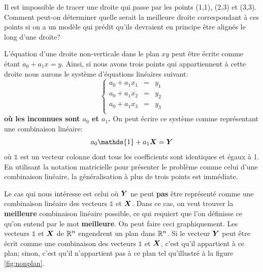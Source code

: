 \begin{center}
\begin{minipage}{0.45\textwidth}
Il est impossible de tracer une droite qui passe par les points (1,1), (2,3) et (3,3).
Comment peut-on déterminer quelle serait la meilleure droite correspondant à ces points 
si on a un modèle qui prédit qu'ils devraient
en principe être alignés le long d'une droite?
\end{minipage}\hfill
\begin{minipage}{0.45\textwidth}
\end{minipage}
\end{center}

L'équation d'une droite non-verticale dans le plan $xy$ peut être écrite comme étant
$a_0 + a_1 x = y$.  Ainsi, si nous avons trois points qui appartiennent à cette droite
nous aurons le système d'équations linéaires suivant:
\[
\left\{
\begin{matrix}
a_0 + a_1 x_1 &=& y_1 \\
a_0 + a_1 x_2 &=& y_2 \\
a_0 + a_1 x_3 &=& y_3 \\
\end{matrix}
\right.
\]
\textbf{où les inconnues sont $a_0$ et $a_1$.}
On peut écrire ce système comme représentant une combinaison linéaire:
\[
a_0 \mathds{1} + a_1\matX = \matY
\]
où $\mathds{1}$ est un vecteur colonne dont tous les coefficients sont identiques
et égaux à 1.  En utilisant la notation matricielle pour présenter le problème comme
celui d'une combinaison linéaire, la généralisation à plus de trois points est immédiate.

Le cas qui nous intéresse est celui où $\boldsymbol{Y}$ ne peut \textbf{pas} être représenté comme
une combinaison linéaire des vecteurs $\mathds{1}$ et $\boldsymbol{X}$.  Dans ce cas, on veut
trouver la \textbf{meilleure} combinaison linéaire possible, ce qui requiert que l'on
définisse ce qu'on entend par le mot \textbf{meilleure}.  On peut faire ceci
graphiquement.  Les vecteurs $\mathds{1}$ et $\boldsymbol{X}$ de $\mathbb{R}^n$ engendrent un plan dans
$\mathbb{R}^n$.  Si le vecteur  $\boldsymbol{Y}$ peut être écrit comme une combinaison des vecteurs
$\mathds{1}$ et $\boldsymbol{X}$, c'est qu'il appartient à ce plan; sinon, c'est qu'il n'appartient
pas à ce plan tel qu'illustré à la figure \ref{fig:nonplan}.

